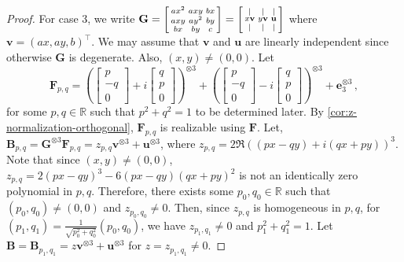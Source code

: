\documentclass[11pt]{article}
\newcommand{\teh}{^{\otimes 3}}
\newcommand{\transpose}{^\intercal}
\begin{document}
\begin{proof}
  For case 3, we write $\mathbf{G} = \begin{bsmallmatrix}
    a x^2 & axy & bx \\
    axy & ay^2 & by \\
    bx & by & c
    \end{bsmallmatrix} = \begin{bsmallmatrix}
    \vert & \vert & \vert \\
    x \mathbf{v} & y \mathbf{v} & \mathbf{u} \\
    \vert & \vert & \vert
  \end{bsmallmatrix}$ where $\mathbf{v} = (ax, ay, b)\transpose$.
  We may assume that $\mathbf{v}$ and $\mathbf{u}$ are linearly independent since otherwise $\mathbf{G}$ is degenerate.
  Also, $(x, y) \ne (0, 0)$.
  Let
  \[
    \mathbf{F}_{p,q} = \left(\begin{bmatrix}
      p \\ -q \\ 0
    \end{bmatrix} + i \begin{bmatrix}
    q \\ p \\ 0
    \end{bmatrix}\right)\teh + 
\left(\begin{bmatrix}
      p \\ -q \\ 0
    \end{bmatrix} - i \begin{bmatrix}
    q \\ p \\ 0
    \end{bmatrix}\right)\teh + 
    \mathbf{e}_3\teh \, ,
  \]
  for some $p, q \in \mathbb{R}$ such that $p^2 + q^2 = 1$ to be determined later.
  By \cref{cor:z-normalization-orthogonal}, $\mathbf{F}_{p, q}$ is realizable using $\mathbf{F}$.
  Let, $\mathbf{B}_{p,q} = \mathbf{G}\teh \mathbf{F}_{p,q}= z_{p, q} \mathbf{v}\teh + \mathbf{u}\teh$, where $z_{p, q} = 2 \Re( (px - qy) + i (qx + py) )^3$.
  Note that since $(x, y) \ne (0, 0)$, $z_{p, q} = 2 (px - qy)^3 - 6 (px - qy)(qx + py)^2$ is not an identically zero polynomial in $p, q$.
  Therefore, there exists some $p_0, q_0 \in \mathbb{R}$ such that $(p_0, q_0) \ne (0, 0)$ and $z_{p_0, q_0} \ne 0$.
  Then, since $z_{p,q}$ is homogeneous in $p, q$, for $(p_1, q_1) = \frac{1}{\sqrt{p_0^2 + q_0^2}}(p_0, q_0)$, we have $z_{p_1, q_1} \ne 0$ and $p_1^2 + q_1^2 = 1$.
  Let $\mathbf{B} = \mathbf{B}_{p_1, q_1} = z \mathbf{v}\teh + \mathbf{u}\teh$ for $z = z_{p_1, q_1} \ne 0$.


\end{proof}
\end{document}
